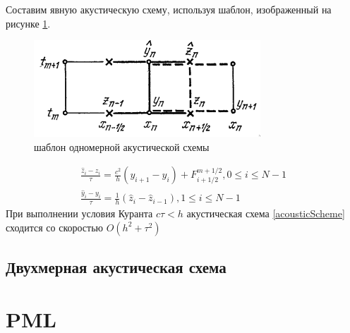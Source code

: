 \documentclass[a4paper, fontsize=14pt]{article} \usepackage{course_work} 
\begin{document}
Составим явную акустическую схему, используя шаблон, изображенный на рисунке \ref{acousticTpl}.
\begin{figure}[h]
    \label{acousticTpl}
    \centering
    \includegraphics{scheme1d}
    \caption{шаблон одномерной акустической схемы}
\end{figure}
\begin{equation}
    \label{acousticScheme}
    \begin{gathered}
        \frac{\hat{z}_i - z_i}{\tau}=\frac{c^2}{h} (y_{i+1} - y_{i}) + F^{m+1/2}_{i+1/2}, 0\leq i\leq N-1\\
        \frac{\hat{y}_i - y_i}{\tau}=\frac{1}{h}(\hat{z}_i - \hat{z}_{i-1}), 1 \leq i \leq N-1
    \end{gathered}
\end{equation}
При выполнении условия Куранта $c\tau<h$ акустическая схема \ref{acousticScheme} сходится со
скоростью $O(h^2+\tau^2)$  \cite{kal}
\subsection{Двухмерная акустическая схема}


\cite{ufdtd}

\section{PML}
\cite{npml}

\newpage


\printbibliography
\end{document}
